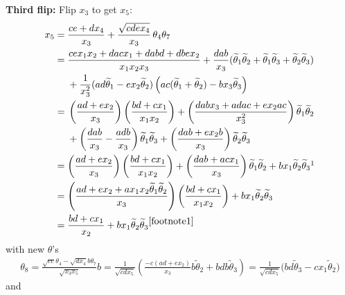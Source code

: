\documentclass[pdftex]{sigma}
\numberwithin{equation}{section}
\begin{document}
{\allowdisplaybreaks \textbf{Third flip:} Flip $x_3$ to get $x_5$:
\begin{align*}
 x_5={} & \frac{ce + dx_4}{x_3} + \frac{\sqrt{cdex_4}}{x_3} \, \theta_4 \theta_7 \\
={} & \frac{cex_1 x_2 + dac x_1 + d a b d + dbex_2}{x_1 x_2 x_3} +
 \frac{dab}{x_3}( \widetilde{\theta}_1\widetilde{\theta}_2 + \widetilde{\theta}_1\widetilde{\theta}_3 +
 \widetilde{\theta}_2 \widetilde{\theta}_3) \\
& {}+ { \frac{1}{x_3^2} (ad \widetilde{\theta}_1 - ex_2 \widetilde{\theta}_2)\left( ac(\widetilde{\theta}_1 + \widetilde{\theta}_2)
 - bx_3 \widetilde{\theta}_3\right) } \\
={} & \left(\frac{ad + ex_2}{x_3}\right)\left(\frac{bd+cx_1}{x_1x_2}\right)
 + \left(\frac{dabx_3 +adac + ex_2 ac}{x_3^2}\right)\widetilde{\theta}_1 \widetilde{\theta}_2 \\
 & {}
 + \left(\frac{dab}{x_3} - \frac{adb}{x_3}\right) \widetilde{\theta}_1 \widetilde{\theta}_3
 + \left(\frac{dab + ex_2 b}{x_3}\right) \widetilde{\theta}_2 \widetilde{\theta}_3 \\
={} &{ \left(\frac{ad + ex_2}{x_3}\right)\left(\frac{bd+cx_1}{x_1x_2}\right)
 + \left(\frac{dab + acx_1}{x_3}\right)\widetilde{\theta}_1 \widetilde{\theta}_2 %
 + %
 b x_1 \widetilde{\theta}_2 \widetilde{\theta}_3 }\footnotemark \\
={} & { \left(\frac{ad + ex_2 + a x_1x_2 \widetilde{\theta}_1 \widetilde{\theta}_2}{x_3}\right)\left(\frac{bd+cx_1}{x_1x_2}\right)
 + %
 b x_1 \widetilde{\theta}_2 \widetilde{\theta}_3 } \\
={} & \frac{bd+cx_1}{x_2} + bx_1 \widetilde{\theta}_2 \widetilde{\theta}_3{}^{\ref{footnote1}}
\end{align*}
$\!\!$with new $\theta$'s
\begin{align*}
 \theta_8 = \frac{\sqrt{ce} \theta_4 - \sqrt{dx_4} b \theta_7}{\sqrt{x_3x_5}} b
 = \frac{1}{\sqrt{cdx_5}} \left( \frac{-c(ad+ex_2)}{x_3} b \widetilde{\theta}_2 + bd b \widetilde{\theta}_3 \right)
 = \frac{1}{\sqrt{cdx_5}} \big( bd \widetilde{\theta}_3 - cx_1 \widetilde{\theta}_2 \big)
\end{align*}
and
\begin{align*}

\end{align*}}
\end{document}
